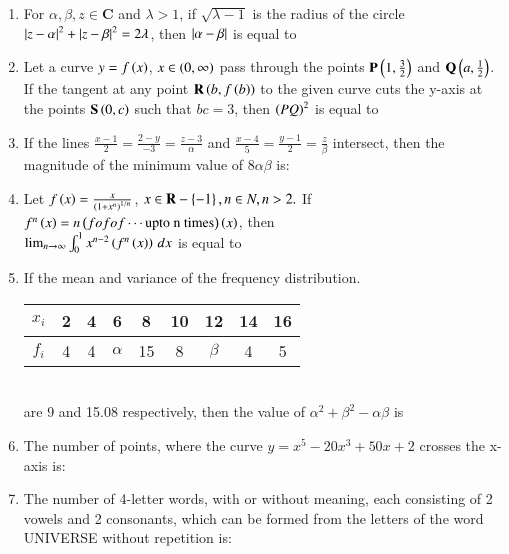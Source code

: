\documentclass[journal]{IEEEtran}
\numberwithin{equation}{enumi}
\numberwithin{figure}{enumi}
\begin{document}
\begin{enumerate}[start=16]
    \item For $\alpha,\beta,z\in\mathbf{C}$ and $\lambda>1$, if $\sqrt{\lambda-1}$ is the radius of the circle $\left\vert z-\alpha\right\vert^2+\left\vert z-\beta\right\vert^2=2\lambda$, then $\left\vert\alpha-\beta\right\vert$ is equal to

    \item Let a curve $y = f\left(x\right)$,  $x\in\left(0,\infty\right)$ pass through the points $\mathbf{P}\left(1,\frac{3}{2}\right)$ and $\mathbf{Q}\left(a,\frac{1}{2}\right)$. If the tangent at any point $\mathbf{R}\left(b,f\left(b\right)\right)$ to the given curve cuts the y-axis at the points $\mathbf{S}\left(0,c\right)$ such that $bc=3$, then $\left(PQ\right)^2$ is equal to

    \item If the lines $\frac{x-1}{2} = \frac{2 - y}{-3} = \frac{z - 3}{\alpha}$ and $\frac{x - 4}{5} = \frac{y - 1}{2} = \frac{z}{\beta}$ intersect, then the magnitude of the minimum value of $8 \alpha \beta$ is:

    \item Let $f\left(x\right)=\frac{x}{\left(1+x^{n}\right)^{1/n}}$, $x\in\mathbf{R}-\left\{-1\right\},n\in N,n>2.$ If $f^n\left(x\right)=n\left(fofof\cdots \text{upto n times}\right)\left(x\right)$, then\\
    $\lim_{n\to\infty}\int_{0}^{1} x^{n-2}\left(f^n\left(x\right)\right) \,dx$ is equal to

    \item If the mean and variance of the frequency distribution. \\
    \begin{tabular}{|c|c|c|c|c|c|c|c|c|} 
        \hline
            $x_i$ & 2 & 4 & 6 & 8 & 10 & 12 & 14 & 16 \\ 
        \hline
            $f_i$ & 4 & 4 & $\alpha$ & 15 & 8 & $\beta$ & 4 & 5 \\ 
        \hline
    \end{tabular}\\
    are 9 and 15.08 respectively, then the  value of $\alpha^2+\beta^2-\alpha\beta$ is

    \item The number of points, where the curve $y=x^{5}-20x^{3}+50x+2$ crosses the x-axis is:

    \item The number of 4-letter words, with or without meaning, each consisting of 2 vowels and 2 consonants, which can be formed from the letters of the word UNIVERSE without repetition is: \\


\end{enumerate}
\end{document}
